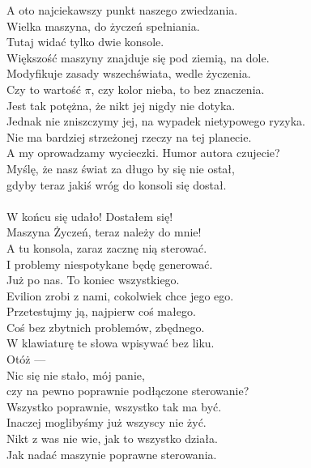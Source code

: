 \charnad{}
A oto najciekawszy punkt naszego zwiedzania.\\
Wielka maszyna, do życzeń spełniania.\\
Tutaj widać tylko dwie konsole.\\
Większość maszyny znajduje się pod ziemią, na dole.\\
Modyfikuje zasady wszechświata, wedle życzenia.\\
Czy to wartość $\pi$, czy kolor nieba, to bez znaczenia.\\
Jest tak potężna, że nikt jej nigdy nie dotyka.\\
Jednak nie zniszczymy jej, na wypadek nietypowego ryzyka.\\
Nie ma bardziej strzeżonej rzeczy na tej planecie.\\
A my oprowadzamy wycieczki. Humor autora czujecie?\\
Myślę, że nasz świat za długo by się nie ostał,\\
gdyby teraz jakiś wróg do konsoli się dostał.\\

\\

\chardok{}
W końcu się udało! Dostałem się!\\
Maszyna Życzeń, teraz należy do mnie!\\
A tu konsola, zaraz zacznę nią sterować.\\
I problemy niespotykane będę generować.\\

\charmik{}
Już po nas. To koniec wszystkiego.\\
Evilion zrobi z nami, cokolwiek chce jego ego.\\

\chardok{}
Przetestujmy ją, najpierw coś małego.\\
Coś bez zbytnich problemów, zbędnego.\\
W klawiaturę te słowa wpisywać bez liku.\\
Otóż --- \\

\charprzy{}
Nic się nie stało, mój panie,\\
czy na pewno poprawnie podłączone sterowanie?\\

\charmik{}
Wszystko poprawnie, wszystko tak ma być.\\
Inaczej moglibyśmy już wszyscy nie żyć.\\
Nikt z was nie wie, jak to wszystko działa.\\
Jak nadać maszynie poprawne sterowania.\\


